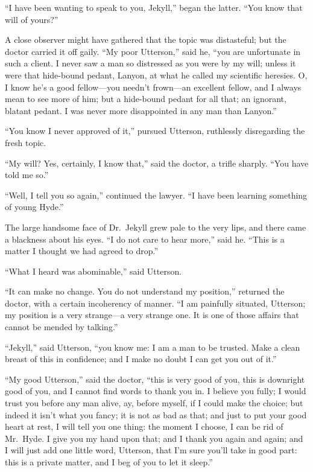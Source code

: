 \documentclass[12pt,openright]{book}
\begin{document}
“I have been wanting to speak to you, Jekyll,” began the latter. “You know that will of yours?”

A close observer might have gathered that the topic was distasteful; but the doctor carried it off gaily. “My poor Utterson,” said he, “you are unfortunate in such a client. I never saw a man so distressed as you were by my will; unless it were that hide-bound pedant, Lanyon, at what he called my scientific heresies. O, I know he’s a good fellow—you needn’t frown—an excellent fellow, and I always mean to see more of him; but a hide-bound pedant for all that; an ignorant, blatant pedant. I was never more disappointed in any man than Lanyon.”

“You know I never approved of it,” pursued Utterson, ruthlessly disregarding the fresh topic.

“My will? Yes, certainly, I know that,” said the doctor, a trifle sharply. “You have told me so.”

“Well, I tell you so again,” continued the lawyer. “I have been learning something of young Hyde.”

The large handsome face of Dr. Jekyll grew pale to the very lips, and there came a blackness about his eyes. “I do not care to hear more,” said he. “This is a matter I thought we had agreed to drop.”

“What I heard was abominable,” said Utterson.

“It can make no change. You do not understand my position,” returned the doctor, with a certain incoherency of manner. “I am painfully situated, Utterson; my position is a very strange—a very strange one. It is one of those affairs that cannot be mended by talking.”

“Jekyll,” said Utterson, “you know me: I am a man to be trusted. Make a clean breast of this in confidence; and I make no doubt I can get you out of it.”

“My good Utterson,” said the doctor, “this is very good of you, this is downright good of you, and I cannot find words to thank you in. I believe you fully; I would trust you before any man alive, ay, before myself, if I could make the choice; but indeed it isn’t what you fancy; it is not as bad as that; and just to put your good heart at rest, I will tell you one thing: the moment I choose, I can be rid of Mr. Hyde. I give you my hand upon that; and I thank you again and again; and I will just add one little word, Utterson, that I’m sure you’ll take in good part: this is a private matter, and I beg of you to let it sleep.”
\end{document}
